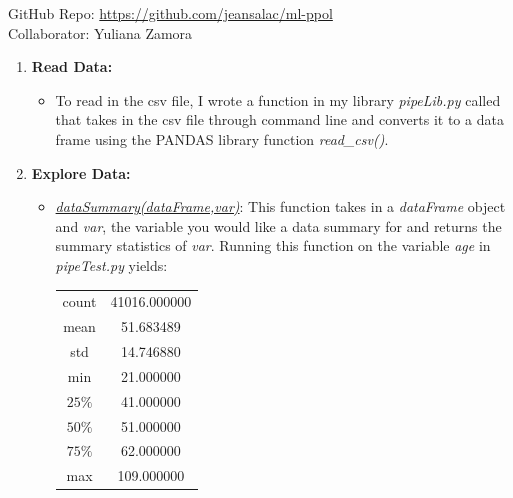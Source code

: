 \documentclass[letterpaper,12pt]{article}
\begin{document}
\maketitle
\begin{center}
GitHub Repo: \url{https://github.com/jeansalac/ml-ppol} \\
Collaborator: Yuliana Zamora
\end{center}
\begin{enumerate}
\item \textbf{Read Data:} 
\begin{itemize}
\item To read in the csv file, I wrote a function in my library \textit{pipeLib.py} called  that takes in the csv file through command line and converts it to a data frame using the PANDAS library function \textit{read\_csv()}. 
\end{itemize}


\item \textbf{Explore Data:}
\begin{itemize}
\item \underline{\textit{dataSummary(dataFrame,var)}}: This function takes in a \textit{dataFrame} object and \textit{var}, the variable you would like a data summary for and returns the summary statistics of \textit{var}. Running this function on the variable \textit{age} in \textit{pipeTest.py} yields:
\begin{center}
\begin{tabular}{c c}
count  &  41016.000000 \\
mean   &     51.683489 \\
std    &     14.746880 \\
min    &     21.000000 \\
$25\%$    &     41.000000 \\
$50\%$    &     51.000000 \\
$75\%$    &     62.000000 \\
max    &    109.000000 \\
\end{tabular}
\end{center}

\newpage


\end{itemize}
\end{enumerate}
\end{document}
